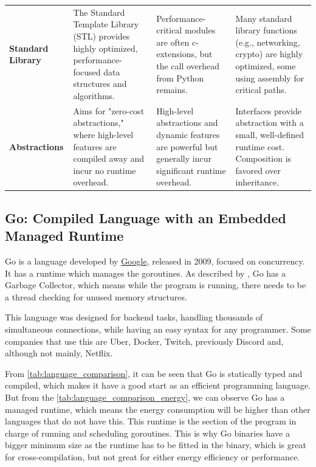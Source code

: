 \begin{table}
\begin{tabularx}{\textwidth}{
		>{\raggedright\arraybackslash}p{}
		>{\raggedright\arraybackslash}X
		>{\raggedright\arraybackslash}X
		>{\raggedright\arraybackslash}X
	}
		\textbf{Standard Library} &
		The Standard Template Library (STL) provides highly optimized, performance-focused data structures and algorithms. &
		Performance-critical modules are often \Glspl{c-extension}, but the call overhead from Python remains. &
		Many standard library functions (e.g., networking, crypto) are highly optimized, some using assembly for critical paths. \\
        \addlinespace

		\textbf{Abstractions} &
		Aims for "zero-cost abstractions," where high-level features are compiled away and incur no runtime overhead. &
		High-level abstractions and dynamic features are powerful but generally incur significant runtime overhead. &
		Interfaces provide abstraction with a small, well-defined runtime cost. Composition is favored over inheritance. \\
		\bottomrule
	\end{tabularx}
\end{table}

\FloatBarrier

\subsection{Go: Compiled Language with an Embedded Managed Runtime}
Go is a language developed by \href{https://google.com}{Google}, released in 2009, focused on concurrency. It has a runtime which manages the \glspl{goroutine}. As described by \cite{rosecrance2019garbage}, Go has a Garbage Collector, which means while the program is running, there needs to be a thread checking for unused memory structures. 

This language was designed for backend tasks, handling thousands of simultaneous connections, while having an easy syntax for any programmer. Some companies that use this are Uber, Docker, Twitch, previously Discord \cite{discord-blog-go-rust} and, although not mainly, Netflix.

From \autoref{tab:language_comparison}, it can be seen that Go is statically typed and compiled, which makes it have a good start as an efficient programming language. But from the \autoref{tab:language_comparison_energy}, we can observe Go has a managed runtime, which means the energy consumption will be higher than other languages that do not have this. This runtime is the section of the program in charge of running and scheduling \glspl{goroutine}. This is why Go binaries have a bigger minimum size as the runtime has to be fitted in the binary, which is great for \gls{cross-compilation}, but not great for either energy efficiency or performance.

